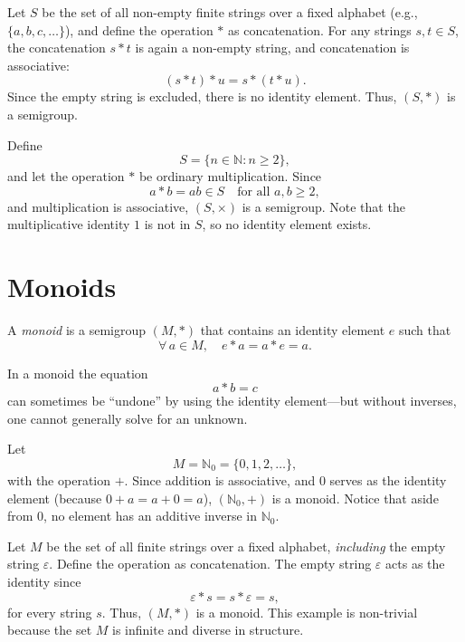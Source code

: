 \documentclass[11pt,openany]{article}
\begin{document}
\begin{example}
	Let \(S\) be the set of all non-empty finite strings over a fixed alphabet (e.g., \(\{a,b,c,\dots\}\)), and define the operation \(\ast\) as concatenation. For any strings \(s,t\in S\), the concatenation \(s\ast t\) is again a non-empty string, and concatenation is associative:
	\[
	(s\ast t)\ast u = s\ast (t\ast u).
	\]
	Since the empty string is excluded, there is no identity element. Thus, \((S,\ast)\) is a semigroup.
\end{example}

\begin{example}
	Define 
	\[
	S = \{n\in \mathbb{N} : n \ge 2\},
	\]
	and let the operation \(\ast\) be ordinary multiplication. Since
	\[
	a\ast b = ab \in S \quad \text{for all } a,b \ge 2,
	\]
	and multiplication is associative, \((S, \times)\) is a semigroup. Note that the multiplicative identity \(1\) is not in \(S\), so no identity element exists.
\end{example}

\section{Monoids}
\begin{definition}[Monoid]
	A \emph{monoid} is a semigroup \((M, \ast)\) that contains an identity element \(e\) such that
	\[
	\forall\, a \in M,\quad e\ast a = a\ast e = a.
	\]
\end{definition}

In a monoid the equation
\[
a\ast b = c
\]
can sometimes be “undone” by using the identity element—but without inverses, one cannot generally solve for an unknown.

\begin{example}
	Let
	\[
	M = \mathbb{N}_0 = \{0,1,2,\dots\},
	\]
	with the operation \(+\). Since addition is associative, and \(0\) serves as the identity element (because \(0+a=a+0=a\)), \((\mathbb{N}_0, +)\) is a monoid. Notice that aside from \(0\), no element has an additive inverse in \(\mathbb{N}_0\).
\end{example}

\begin{example}
	Let \(M\) be the set of all finite strings over a fixed alphabet, \emph{including} the empty string \(\varepsilon\). Define the operation as concatenation. The empty string \(\varepsilon\) acts as the identity since
	\[
	\varepsilon \ast s = s \ast \varepsilon = s,
	\]
	for every string \(s\). Thus, \((M,\ast)\) is a monoid. This example is non-trivial because the set \(M\) is infinite and diverse in structure.
\end{example}
\end{document}
